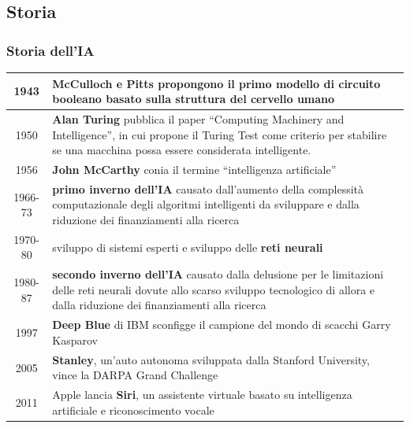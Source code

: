 \subsection{Storia}
\subsubsection*{Storia dell'IA}
\begin{center}
	\begin{tabularx}{\textwidth}{c X}
		1943 &
		\textbf{McCulloch} e \textbf{Pitts} propongono il primo modello di circuito booleano basato sulla struttura del cervello
		umano \\
		\midrule

		1950 &
		\textbf{Alan Turing} pubblica il paper ``Computing Machinery and Intelligence'', in cui propone il Turing Test come
		criterio per stabilire se una macchina possa essere considerata intelligente. \\
		\midrule

		1956 &
		\textbf{John McCarthy} conia il termine ``intelligenza artificiale'' \\
		\midrule

		1966-73 & 
		\textbf{primo inverno dell'IA} causato dall'aumento della complessità computazionale degli algoritmi intelligenti da
		sviluppare e dalla riduzione dei finanziamenti alla ricerca \\
		\midrule

		1970-80 &
		sviluppo di sistemi esperti e sviluppo delle \textbf{reti neurali} \\
		\midrule

		1980-87 &
		\textbf{secondo inverno dell'IA} causato dalla delusione per le limitazioni delle reti neurali dovute allo scarso
		sviluppo tecnologico di allora e dalla riduzione dei finanziamenti alla ricerca \\
		\midrule

		1997 &
		\textbf{Deep Blue} di IBM sconfigge il campione del mondo di scacchi Garry Kasparov \\
		\midrule

		2005 &
		\textbf{Stanley}, un'auto autonoma sviluppata dalla Stanford University, vince la DARPA Grand Challenge \\
		\midrule

		2011 &
		Apple lancia \textbf{Siri}, un assistente virtuale basato su intelligenza artificiale e riconoscimento vocale \\
		\midrule


\end{tabularx}
\end{center}
